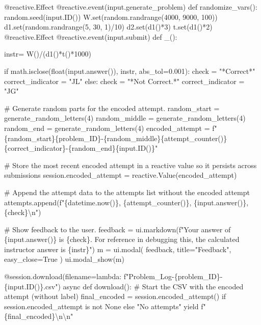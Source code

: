 \documentclass[
  letterpaper,
  DIV=11,
  numbers=noendperiod]{scrreprt}
\newenvironment{Shaded}{\begin{snugshade}}{\end{snugshade}}
\newcommand{\NormalTok}[1]{\textcolor[rgb]{0.00,0.23,0.31}{#1}}
\begin{document}
\begin{Shaded}
\begin{Highlighting}[]
\NormalTok{    @reactive.Effect}
\NormalTok{    @reactive.event(input.generate\_problem)}
\NormalTok{    def randomize\_vars():}
\NormalTok{        random.seed(input.ID())}
\NormalTok{        W.set(random.randrange(4000, 9000, 100))}
\NormalTok{        d1.set(random.randrange(5, 30, 1)/10)}
\NormalTok{        d2.set(d1()*3)}
\NormalTok{        t.set(d1()*2)}
\NormalTok{    @reactive.Effect}
\NormalTok{    @reactive.event(input.submit)}
\NormalTok{    def \_():}
        
\NormalTok{        instr= W()/(d1()*t()*1000)}
        
\NormalTok{        if math.isclose(float(input.answer()), instr, abs\_tol=0.001):}
\NormalTok{            check = "*Correct*"}
\NormalTok{            correct\_indicator = "JL"}
\NormalTok{        else:}
\NormalTok{            check = "*Not Correct.*"}
\NormalTok{            correct\_indicator = "JG"}

\NormalTok{        \# Generate random parts for the encoded attempt.}
\NormalTok{        random\_start = generate\_random\_letters(4)}
\NormalTok{        random\_middle = generate\_random\_letters(4)}
\NormalTok{        random\_end = generate\_random\_letters(4)}
\NormalTok{        encoded\_attempt = f"\{random\_start\}\{problem\_ID\}{-}\{random\_middle\}\{attempt\_counter()\}\{correct\_indicator\}{-}\{random\_end\}\{input.ID()\}"}

\NormalTok{        \# Store the most recent encoded attempt in a reactive value so it persists across submissions}
\NormalTok{        session.encoded\_attempt = reactive.Value(encoded\_attempt)}

\NormalTok{        \# Append the attempt data to the attempts list without the encoded attempt}
\NormalTok{        attempts.append(f"\{datetime.now()\}, \{attempt\_counter()\}, \{input.answer()\}, \{check\}\textbackslash{}n")}

\NormalTok{        \# Show feedback to the user.}
\NormalTok{        feedback = ui.markdown(f"Your answer of \{input.answer()\} is \{check\}. For reference in debugging this, the calculated instructor answer is \{instr\}")}
\NormalTok{        m = ui.modal(}
\NormalTok{            feedback,}
\NormalTok{            title="Feedback",}
\NormalTok{            easy\_close=True}
\NormalTok{        )}
\NormalTok{        ui.modal\_show(m)}

\NormalTok{    @session.download(filename=lambda: f"Problem\_Log{-}\{problem\_ID\}{-}\{input.ID()\}.csv")}
\NormalTok{    async def download():}
\NormalTok{        \# Start the CSV with the encoded attempt (without label)}
\NormalTok{        final\_encoded = session.encoded\_attempt() if session.encoded\_attempt is not None else "No attempts"}
\NormalTok{        yield f"\{final\_encoded\}\textbackslash{}n\textbackslash{}n"}
        

\end{Highlighting}
\end{Shaded}
\end{document}
